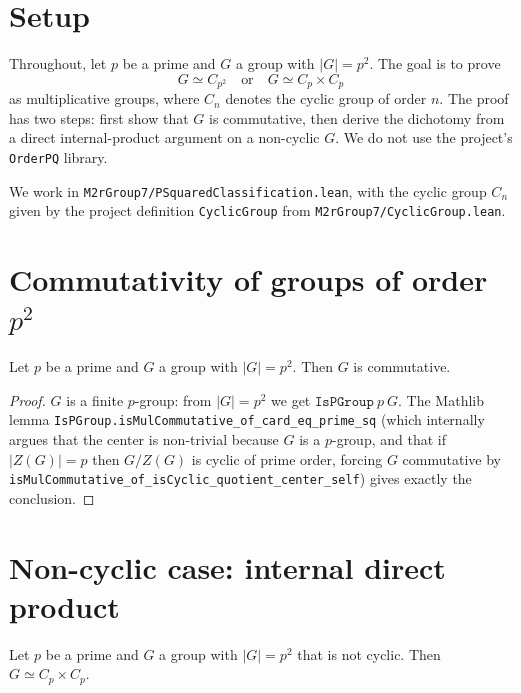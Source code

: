 


\section{Setup}

Throughout, let $p$ be a prime and $G$ a group with $|G| = p^2$. The goal is
to prove
\[
  G \simeq C_{p^2} \quad\text{or}\quad G \simeq C_p \times C_p
\]
as multiplicative groups, where $C_n$ denotes the cyclic group of order $n$.
The proof has two steps: first show that $G$ is commutative, then derive the
dichotomy from a direct internal-product argument on a non-cyclic $G$. We do
not use the project's \texttt{OrderPQ} library.

We work in
\texttt{M2rGroup7/PSquaredClassification.lean}, with the cyclic group
$C_n$ given by the project definition \texttt{CyclicGroup} from
\texttt{M2rGroup7/CyclicGroup.lean}.

\section{Commutativity of groups of order $p^2$}

\begin{lemma}
  \label{lem:commutative-of-card-eq-prime-sq}
  \leanok
  Let $p$ be a prime and $G$ a group with $|G| = p^2$. Then $G$ is
  commutative.
\end{lemma}

\begin{proof}
  $G$ is a finite $p$-group: from $|G| = p^2$ we get
  $\texttt{IsPGroup}\ p\ G$. The Mathlib lemma
  \texttt{IsPGroup.isMulCommutative\_of\_card\_eq\_prime\_sq} (which
  internally argues that the center is non-trivial because $G$ is a $p$-group,
  and that if $|Z(G)| = p$ then $G/Z(G)$ is cyclic of prime order, forcing
  $G$ commutative by \texttt{isMulCommutative\_of\_isCyclic\_quotient\_center\_self})
  gives exactly the conclusion.
\end{proof}

\section{Non-cyclic case: internal direct product}

\begin{lemma}
  \label{lem:mulEquiv-prod-of-not-isCyclic}
  \leanok
  Let $p$ be a prime and $G$ a group with $|G| = p^2$ that is not cyclic.
  Then $G \simeq C_p \times C_p$.
\end{lemma}

